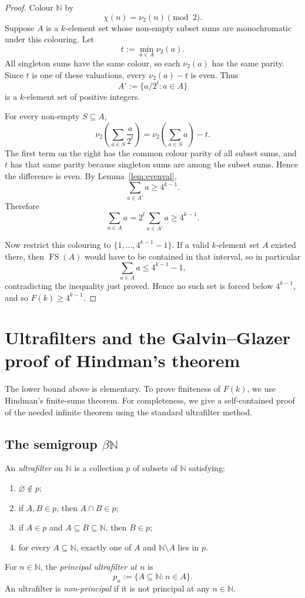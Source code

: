\documentclass[11pt]{article}
\newcommand{\NN}{\mathbb N}
\newcommand{\FS}{\operatorname{FS}}
\begin{document}
\begin{proof}
Colour $\NN$ by
\[
    \chi(n)=\nu_2(n)\pmod 2.
\]
Suppose $A$ is a $k$-element set whose non-empty subset sums are monochromatic under this colouring. Let
\[
    t:=\min_{a\in A}\nu_2(a).
\]
All singleton sums have the same colour, so each $\nu_2(a)$ has the same parity. Since $t$ is one of these valuations, every $\nu_2(a)-t$ is even. Thus
\[
    A':=\{a/2^t:a\in A\}
\]
is a $k$-element set of positive integers.

For every non-empty $S\subseteq A$,
\[
    \nu_2\left(\sum_{a\in S}\frac{a}{2^t}\right)
    =
    \nu_2\left(\sum_{a\in S}a\right)-t.
\]
The first term on the right has the common colour parity of all subset sums, and $t$ has that same parity because singleton sums are among the subset sums. Hence the difference is even. By Lemma~\ref{lem:evenval},
\[
    \sum_{a\in A'}a\geq 4^{k-1}.
\]
Therefore
\[
    \sum_{a\in A}a=2^t\sum_{a\in A'}a\geq 4^{k-1}.
\]

Now restrict this colouring to $\{1,\ldots,4^{k-1}-1\}$. If a valid $k$-element set $A$ existed there, then $\FS(A)$ would have to be contained in that interval, so in particular
\[
    \sum_{a\in A}a\leq 4^{k-1}-1,
\]
contradicting the inequality just proved. Hence no such set is forced below $4^{k-1}$, and so $F(k)\geq 4^{k-1}$.
\end{proof}

\section{Ultrafilters and the Galvin--Glazer proof of Hindman's theorem}

The lower bound above is elementary. To prove finiteness of $F(k)$, we use Hindman's finite-sums theorem. For completeness, we give a self-contained proof of the needed infinite theorem using the standard ultrafilter method.

\subsection{The semigroup \texorpdfstring{$\beta\NN$}{beta N}}

An \emph{ultrafilter} on $\NN$ is a collection $p$ of subsets of $\NN$ satisfying:
\begin{enumerate}[label=(\roman*)]
    \item $\varnothing\notin p$;
    \item if $A,B\in p$, then $A\cap B\in p$;
    \item if $A\in p$ and $A\subseteq B\subseteq \NN$, then $B\in p$;
    \item for every $A\subseteq\NN$, exactly one of $A$ and $\NN\setminus A$ lies in $p$.
\end{enumerate}
For $n\in\NN$, the \emph{principal ultrafilter at $n$} is
\[
    p_n:=\{A\subseteq\NN:n\in A\}.
\]
An ultrafilter is \emph{non-principal} if it is not principal at any $n\in\NN$.
\end{document}
